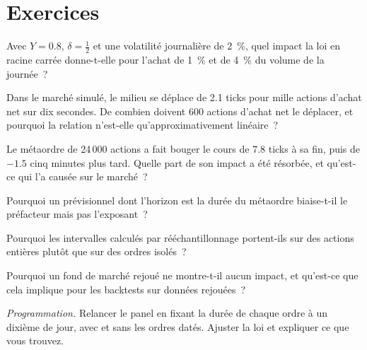 \section{Exercices}

\begin{exercise}[$\star$]\label{exo:mx:the-empirics-of-price-impact:1}
Avec $Y=0.8$, $\delta=\tfrac12$ et une volatilité journalière de 2~\%, quel impact la loi en racine carrée donne-t-elle pour l'achat de 1~\% et de 4~\% du volume de la journée~?
\end{exercise}

\begin{exercise}[$\star$]\label{exo:mx:the-empirics-of-price-impact:2}
Dans le marché simulé, le milieu se déplace de 2.1 ticks pour mille actions d'achat net sur dix secondes. De combien doivent 600 actions d'achat net le déplacer, et
pourquoi la relation n'est-elle qu'approximativement linéaire~?
\end{exercise}

\begin{exercise}[$\star$]\label{exo:mx:the-empirics-of-price-impact:3}
Le métaordre de 24\,000 actions a fait bouger le cours de 7.8 ticks à sa fin, puis de $-1.5$ cinq minutes plus tard. Quelle part de son impact a été résorbée, et qu'est-ce qui
l'a causée sur le marché~?
\end{exercise}

\begin{exercise}[$\star\star$]\label{exo:mx:the-empirics-of-price-impact:4}
Pourquoi un prévisionnel dont l'horizon est la durée du métaordre biaise-t-il le préfacteur mais pas l'exposant~?
\end{exercise}

\begin{exercise}[$\star\star$]\label{exo:mx:the-empirics-of-price-impact:5}
Pourquoi les intervalles calculés par rééchantillonnage portent-ils sur des actions entières plutôt que sur des ordres isolés~?
\end{exercise}

\begin{exercise}[$\star\star$]\label{exo:mx:the-empirics-of-price-impact:6}
Pourquoi un fond de marché rejoué ne montre-t-il aucun impact, et qu'est-ce que cela implique pour les backtests sur données rejouées~?
\end{exercise}

\begin{exercise}[$\star\star\star$]\label{exo:mx:the-empirics-of-price-impact:7}
\emph{Programmation.} Relancer le panel en fixant la durée de chaque ordre à un dixième de jour, avec et sans les ordres datés. Ajuster la loi et expliquer ce que
vous trouvez.
\end{exercise}

